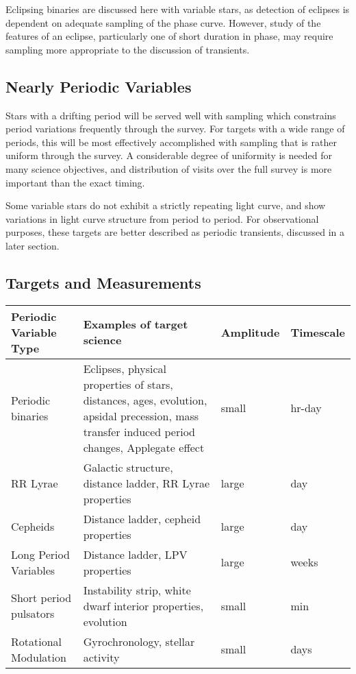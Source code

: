 Eclipsing binaries are discussed here with variable stars, as detection of eclipses is dependent on adequate sampling of the phase curve.  However, study of the  features of an eclipse, particularly one of short duration in phase, may require sampling more appropriate to the discussion of transients.

\subsection{Nearly Periodic Variables}

Stars with a drifting  period will be served well with sampling which constrains period variations frequently through the survey.  For targets with a wide range of periods, this will be most effectively accomplished with sampling that is rather uniform through the survey.  A considerable degree of uniformity is needed for many science objectives, and distribution of visits over the full survey is more important than the exact timing.

Some variable stars do not exhibit a strictly repeating light curve, and show variations in light curve structure from period to period.  For observational purposes, these targets are better described as periodic transients, discussed in a later section.



\subsection{Targets and Measurements}
\label{sec:keyword:targets}

\begin{center}
\begin{tabular}{| l | p{8cm} |l | l |}
\hline Periodic Variable Type & Examples of target science & Amplitude & Timescale\\
\hline
Periodic binaries & Eclipses, physical properties of stars, distances, ages, evolution, apsidal precession, mass transfer induced period changes, Applegate effect &  small &  hr-day \\
RR Lyrae & Galactic structure, distance ladder, RR Lyrae properties&  large &  day \\
Cepheids & Distance ladder, cepheid properties&  large &  day \\
Long Period Variables & Distance ladder, LPV properties& large  &  weeks \\
Short period pulsators & Instability strip, white dwarf interior properties, evolution&  small & min  \\
Rotational Modulation & Gyrochronology, stellar activity& small  &  days \\
 \hline \end{tabular}
 \end{center}

